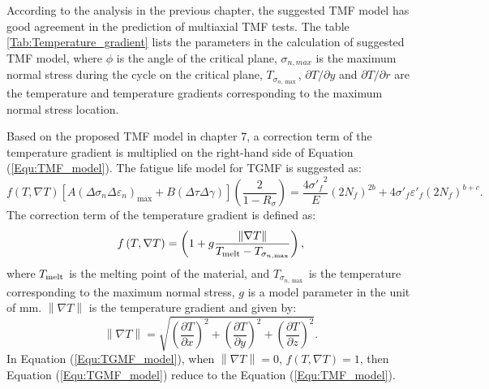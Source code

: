According to the analysis in the previous chapter, the suggested TMF model has good agreement in the prediction of multiaxial TMF tests. The table \ref{Tab:Temperature_gradient} lists the parameters in the calculation of suggested TMF model, where $\phi$ is the angle of the critical plane, $\sigma_{n,max}$ is the maximum normal stress during the cycle on the critical plane, $T_{\sigma_{n,\max}}$, $\partial T/\partial y$ and $\partial T/\partial r$ are the temperature and temperature gradients corresponding to the maximum normal stress location.

Based on the proposed TMF model in chapter 7, a correction term of the temperature gradient is multiplied on the right-hand side of Equation (\ref{Equ:TMF_model}). The fatigue life model for TGMF is suggested as:
\begin{equation}
f\left( {T,\nabla T} \right)\left[ {A{{\left( {\Delta {\sigma _n}\Delta {\varepsilon _n}} \right)}_{\max }} + B\left( {\Delta \tau \Delta \gamma } \right)} \right]\left( {\frac{2}{{1 - {R_\sigma }}}} \right) = \frac{{4{{\sigma '}_f}^2}}{E}{\left( {2{N_f}} \right)^{2b}} + 4{{\sigma '}_f}{{\varepsilon '}_f}{\left( {2{N_f}} \right)^{b + c}}.
\label{Equ:TGMF_model}
\end{equation}
The correction term of the temperature gradient is defined as:
\begin{equation}
f\left( {T,\nabla T} \right) = \left( {1 + g\frac{{\left\| {\nabla T} \right\|}}{{{T_{{\rm{melt}}}} - {T_{{\sigma _{n,\max }}}}}}} \right),
\end{equation}
where ${T_{{\rm{melt}}}}$ is the melting point of the material, and ${T_{{\sigma _{n,\max }}}}$ is the temperature corresponding to the maximum normal stress, $g$ is a model parameter in the unit of mm. ${\left\| {\nabla T} \right\|}$ is the temperature gradient and given by:
\begin{equation}
\left\| {\nabla T} \right\| = \sqrt {{{\left( {\frac{{\partial T}}{{\partial x}}} \right)}^2} + {{\left( {\frac{{\partial T}}{{\partial y}}} \right)}^2} + {{\left( {\frac{{\partial T}}{{\partial z}}} \right)}^2}}.
\end{equation}
In Equation (\ref{Equ:TGMF_model}), when $\left\| {\nabla T} \right\|=0$, $f\left( {T,\nabla T} \right)=1$, then Equation (\ref{Equ:TGMF_model}) reduce to the Equation (\ref{Equ:TMF_model}).


